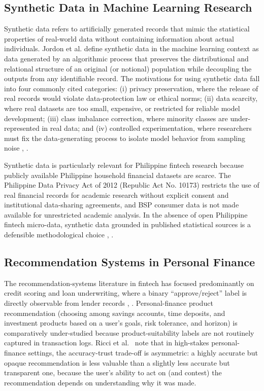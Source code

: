 \documentclass{icsthesis}
\begin{document}
\begin{mainmatter}
			\subsection{Synthetic Data in Machine Learning Research}
				Synthetic data refers to artificially generated records that mimic the statistical properties of real-world data without containing information about actual individuals. Jordon et al. \cite{ref83} define synthetic data in the machine learning context as data generated by an algorithmic process that preserves the distributional and relational structure of an original (or notional) population while decoupling the outputs from any identifiable record. The motivations for using synthetic data fall into four commonly cited categories: (i) privacy preservation, where the release of real records would violate data-protection law or ethical norms; (ii) data scarcity, where real datasets are too small, expensive, or restricted for reliable model development; (iii) class imbalance correction, where minority classes are under-represented in real data; and (iv) controlled experimentation, where researchers must fix the data-generating process to isolate model behavior from sampling noise \cite{ref83}, \cite{ref46}.

                Synthetic data is particularly relevant for Philippine fintech research because publicly available Philippine household financial datasets are scarce. The Philippine Data Privacy Act of 2012 (Republic Act No. 10173) \cite{ref45} restricts the use of real financial records for academic research without explicit consent and institutional data-sharing agreements, and BSP consumer data is not made available for unrestricted academic analysis. In the absence of open Philippine fintech micro-data, synthetic data grounded in published statistical sources is a defensible methodological choice \cite{ref46}, \cite{ref83}.

			\subsection{Recommendation Systems in Personal Finance}
				The recommendation-systems literature in fintech has focused predominantly on credit scoring and loan underwriting, where a binary ``approve/reject'' label is directly observable from lender records \cite{ref56}, \cite{ref57}. Personal-finance product recommendation (choosing among savings accounts, time deposits, and investment products based on a user's goals, risk tolerance, and horizon) is comparatively under-studied because product-suitability labels are not routinely captured in transaction logs. Ricci et al.\ \cite{ref13} note that in high-stakes personal-finance settings, the accuracy-trust trade-off is asymmetric: a highly accurate but opaque recommendation is less valuable than a slightly less accurate but transparent one, because the user's ability to act on (and contest) the recommendation depends on understanding why it was made.


\end{mainmatter}
\end{document}
